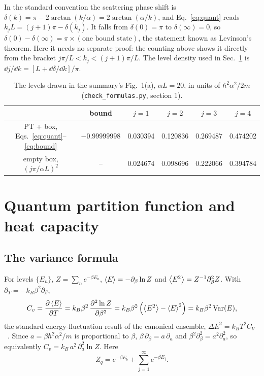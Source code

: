 \documentclass[11pt]{article}
\numberwithin{equation}{section}
\newcommand{\kB}{k_{B}}
\newcommand{\Eu}{\hbar^2\alpha^2/2m}
\begin{document}
In the standard convention the scattering phase shift is $\delta(k)=\pi-2\arctan(k/\alpha)=2\arctan(\alpha/k)$, and Eq.~\eqref{eq:quant} reads $k_jL=(j+1)\pi-\delta(k_j)$. It falls from $\delta(0)=\pi$ to $\delta(\infty)=0$, so $\delta(0)-\delta(\infty)=\pi\times(\text{one bound state})$, the statement known as Levinson's theorem. Here it needs no separate proof: the counting above shows it directly from the bracket $j\pi/L<k_j<(j+1)\pi/L$. The level density used in Sec.~\ref{sec:quantum} is $\dd j/\dd k=[L+\dd\delta/\dd k]/\pi$.

\begin{table}[h]
\centering
\caption{The levels drawn in the summary's Fig.~1(a), $\alpha L=20$, in units of $\Eu$ (\texttt{check\_formulas.py}, section 1).}
\label{tab:levels}
\begin{tabular}{cccccc}
\toprule
 & bound & $j=1$ & $j=2$ & $j=3$ & $j=4$\\
\midrule
PT + box, Eqs.~\eqref{eq:quant}--\eqref{eq:bound} & $-0.99999998$ & 0.030394 & 0.120836 & 0.269487 & 0.474202\\
empty box, $(j\pi/\alpha L)^2$ & -- & 0.024674 & 0.098696 & 0.222066 & 0.394784\\
\bottomrule
\end{tabular}
\end{table}

\section{Quantum partition function and heat capacity}
\label{sec:quantum}

\subsection{The variance formula}
For levels $\{E_n\}$, $Z=\sum_ne^{-\beta E_n}$, $\expval{E}=-\partial_\beta\ln Z$ and $\expval{E^2}=Z^{-1}\partial_\beta^2Z$. With $\partial_T=-\kB\beta^2\partial_\beta$,
\begin{equation}
C_v=\pdv{\expval{E}}{T}=\kB\beta^2\,\pdv[2]{\ln Z}{\beta}=\kB\beta^2\left(\expval{E^2}-\expval{E}^2\right)=\kB\beta^2\,\mathrm{Var}(E),
\label{eq:var}
\end{equation}
the standard energy-fluctuation result of the canonical ensemble, $\Delta E^2=\kB T^2C_V$~\cite[p.~20, \S1.3.2, Eq.~(1.27)]{tongSP}. Since $a=\beta\hbar^2\alpha^2/m$ is proportional to $\beta$, $\beta\,\partial_\beta=a\,\partial_a$ and $\beta^2\partial_\beta^2=a^2\partial_a^2$, so equivalently $C_v=\kB\,a^2\,\partial_a^2\ln Z$. Here
\begin{equation}
Z_q=e^{-\beta E_b}+\sum_{j=1}^{\infty}e^{-\beta E_j}.
\label{eq:Zqsum}
\end{equation}
\end{document}
